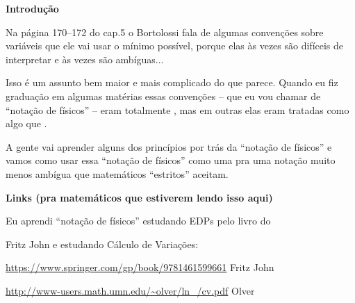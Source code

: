 \documentclass[oneside,12pt]{article}
\begin{document}
\newpage


{\bf Introdução}


Na página 170--172 do cap.5 o Bortolossi fala de algumas convenções
sobre variáveis que ele vai usar o mínimo possível, porque elas às
vezes são difíceis de interpretar e às vezes são ambíguas...

Isso é um assunto bem maior e mais complicado do que parece. Quando eu
fiz graduação em algumas matérias essas convenções -- que eu vou
chamar de ``notação de físicos'' -- eram totalmente
, mas em outras elas eram tratadas como algo
 que .

A gente vai aprender alguns dos princípios por trás da ``notação de
físicos'' e vamos como usar essa ``notação de físicos'' como uma
 pra uma notação muito menos ambígua que
matemáticos ``estritos'' aceitam.


\newpage


{\bf Links (pra matemáticos que estiverem lendo isso aqui)}


Eu aprendi ``notação de físicos'' estudando EDPs pelo livro do

Fritz John e estudando Cálculo de Variações:


{\footnotesize

\url{https://www.springer.com/gp/book/9781461599661} Fritz John



\url{http://www-users.math.umn.edu/~olver/ln_/cv.pdf} Olver

}
\end{document}
